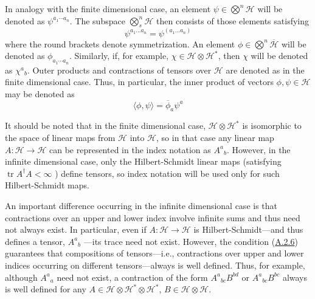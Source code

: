 \documentclass[11pt,a4paper]{article}
\begin{document}
In analogy with the finite dimensional case, an element \(\psi \in \bigotimes^{n} \mathcal{H}\) will be denoted as \(\psi^{a_1 \cdots a_n}\). The subspace \(\bigotimes_s^{n} \mathcal{H}\) then consists of those elements satisfying
\begin{equation*}
\psi^{a_1...a_n} = \psi^{(a_1...a_n)} \tag{A.3.1}\label{eq:A.3.1}
\end{equation*}
where the round brackets denote symmetrization. An element \(\phi\in\bigotimes^n\overline{\mathcal H}\) will be denoted as \(\phi_{a_1 \cdots a_n}\). Similarly, if, for example, \(\chi \in \mathcal{H} \otimes \mathcal{H}^*\), then \(\chi\) will be denoted as \(\chi^a{}_b\). Outer products and contractions of tensors over \(\mathcal{H}\) are denoted as in the finite dimensional case. Thus, in particular, the inner product of vectors \(\phi, \psi \in \mathcal{H}\) may be denoted as
\begin{equation*}
\langle \phi, \psi \rangle = \overline{\phi}_a \psi^a \tag{A.3.2}\label{eq:A.3.2}
\end{equation*}

It should be noted that in the finite dimensional case, \(\mathcal H\otimes\mathcal H^*\) is isomorphic to the space of linear maps from \(\mathcal{H}\) into \(\mathcal{H}\), so in that case any linear map \(A:\mathcal{H} \to \mathcal{H}\) can be represented in the index notation as \(A^a{}_b\). However, in the infinite dimensional case, only the Hilbert-Schmidt linear maps (satisfying \(\operatorname{tr} A^\dagger A < \infty\) ) define tensors, so index notation will be used only for such Hilbert-Schmidt maps.

An important difference occurring in the infinite dimensional case is that contractions over an upper and lower index involve infinite sums and thus need not always exist. In particular, even if \(A: \mathcal{H} \to \mathcal{H}\) is Hilbert-Schmidt---and thus defines a tensor, \(A^a{}_b\) ---its trace need not exist. However, the condition (\hyperref[eq:A.2.6]{A.2.6}) guarantees that compositions of tensors---i.e., contractions over upper and lower indices occurring on different tensors---always is well defined. Thus, for example, although \(A^a{}_a\) need not exist, a contraction of the \hypertarget{source-207}{} form \(A^a{}_{bc}B^{bd}\) or \(A^a{}_{bc}B^{bc}\) always is well defined for any \(A \in \mathcal{H} \otimes \mathcal{H}^* \otimes \mathcal{H}^*\), \(B \in \mathcal{H} \otimes \mathcal{H}\).
\end{document}
